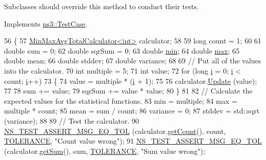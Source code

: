 Subclasses should override this method to conduct their tests. 

Implements \hyperlink{classns3_1_1TestCase_a8ff74680cf017ed42011e4be51917a24}{ns3\+::\+Test\+Case}.


\begin{DoxyCode}
56 \{
57   \hyperlink{classns3_1_1MinMaxAvgTotalCalculator}{MinMaxAvgTotalCalculator<int>} calculator;
58 
59   \textcolor{keywordtype}{long} count = 1;
60 
61   \textcolor{keywordtype}{double} sum = 0;
62   \textcolor{keywordtype}{double} sqrSum = 0;
63   \textcolor{keywordtype}{double} \hyperlink{80211b_8c_ac6afabdc09a49a433ee19d8a9486056d}{min};
64   \textcolor{keywordtype}{double} \hyperlink{80211b_8c_affe776513b24d84b39af8ab0930fef7f}{max};
65   \textcolor{keywordtype}{double} mean;
66   \textcolor{keywordtype}{double} stddev;
67   \textcolor{keywordtype}{double} variance;
68 
69   \textcolor{comment}{// Put all of the values into the calculator.}
70   \textcolor{keywordtype}{int} multiple = 5;
71   \textcolor{keywordtype}{int} value;
72   \textcolor{keywordflow}{for} (\textcolor{keywordtype}{long} \hyperlink{bernuolliDistribution_8m_a6f6ccfcf58b31cb6412107d9d5281426}{i} = 0; \hyperlink{bernuolliDistribution_8m_a6f6ccfcf58b31cb6412107d9d5281426}{i} < count; \hyperlink{bernuolliDistribution_8m_a6f6ccfcf58b31cb6412107d9d5281426}{i}++)
73     \{
74       value = multiple * (\hyperlink{bernuolliDistribution_8m_a6f6ccfcf58b31cb6412107d9d5281426}{i} + 1);
75 
76       calculator.\hyperlink{classns3_1_1MinMaxAvgTotalCalculator_acad1745a8441535648ae95c7037a96e1}{Update} (value);
77 
78       sum    += value;
79       sqrSum += value * value;
80     \}
81 
82   \textcolor{comment}{// Calculate the expected values for the statistical functions.}
83   min = multiple;
84   max = multiple * count;
85   mean = sum / count;
86   variance = 0;
87   stddev = std::sqrt (variance);
88 
89   \textcolor{comment}{// Test the calculator.}
90   \hyperlink{group__testing_ga9e7861b56b4e70db3b56044cb7a28e41}{NS\_TEST\_ASSERT\_MSG\_EQ\_TOL} (calculator.\hyperlink{classns3_1_1MinMaxAvgTotalCalculator_a8f614c4a6a090665a75cea91a68d4486}{getCount}(),    count,    
      \hyperlink{basic-data-calculators-test-suite_8cc_a89311a98397f9d6967d2cb10d5152d77}{TOLERANCE}, \textcolor{stringliteral}{"Count value wrong"});
91   \hyperlink{group__testing_ga9e7861b56b4e70db3b56044cb7a28e41}{NS\_TEST\_ASSERT\_MSG\_EQ\_TOL} (calculator.\hyperlink{classns3_1_1MinMaxAvgTotalCalculator_ae18def40cc95735a4059b8aefb7ba827}{getSum}(),      sum,      
      \hyperlink{basic-data-calculators-test-suite_8cc_a89311a98397f9d6967d2cb10d5152d77}{TOLERANCE}, \textcolor{stringliteral}{"Sum value wrong"});

\end{DoxyCode}
